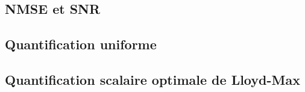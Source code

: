 \documentclass[a4paper, 12pt]{article}
\newcommand{\FSource}[1]{%

}
\begin{document}
\subsection{NMSE et SNR}\label{nmse_snr_code}

\FSource{../disto_1_1.m}

\newpage

\subsection{Quantification uniforme}\label{quant_uni_code}

\FSource{../quant_uni_1_2.m}

\newpage

\subsection{Quantification scalaire optimale de Lloyd-Max}\label{quant_lloyd}

\FSource{../lloyd_max_2_1.m}
\end{document}
